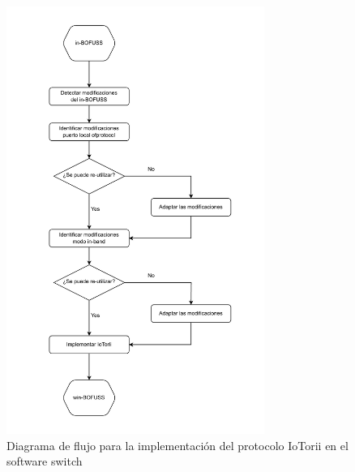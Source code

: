\begin{figure}[ht!]
    \centering
    \includegraphics[width=0.75\textwidth]{archivos/img/dev/winBOFUSS.pdf}
    \caption{Diagrama de flujo para la implementación del protocolo IoTorii en el software switch }
    \label{fig:WIN-BOFUSS}
\end{figure}

